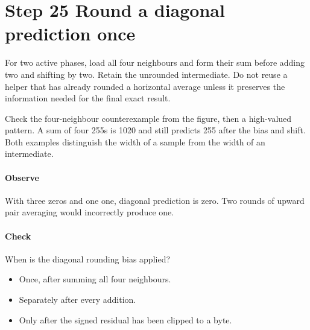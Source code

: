 \section{Step 25 Round a diagonal prediction once}\label{h263-prediction-s05}
For two active phases, load all four neighbours and form their sum before adding
two and shifting by two. Retain the unrounded intermediate. Do not reuse a helper
that has already rounded a horizontal average unless it preserves the information
needed for the final exact result.

Check the four-neighbour counterexample from the figure, then a high-valued
pattern. A sum of four 255s is 1020 and still predicts 255 after the bias and shift.
Both examples distinguish the width of a sample from the width of an intermediate.

\paragraph{Observe} With three zeros and one one, diagonal prediction is zero.
Two rounds of upward pair averaging would incorrectly produce one.
\paragraph{Check} When is the diagonal rounding bias applied?
\begin{itemize}
  \item[A.] Once, after summing all four neighbours.
  \item[B.] Separately after every addition.
  \item[C.] Only after the signed residual has been clipped to a byte.
\end{itemize}
